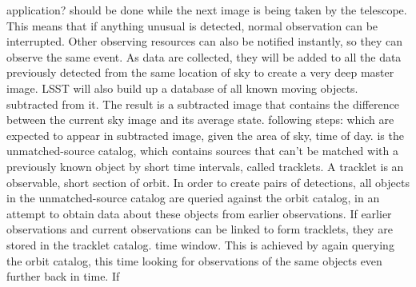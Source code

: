 \documentclass[times]{cpeauth}
\begin{document}
%
application?
%
%
%
should be done while the next image is being taken by the telescope.  This means
that if anything unusual is detected, normal observation can be
interrupted. Other observing resources can also be notified instantly, so they
can observe the same event. As data are collected, they will be added to all the
data previously detected from the same location of sky to create a very deep
master image. LSST will also build up a database of all known moving objects.
%
subtracted from it. The result is a subtracted image that contains the
difference between the current sky image and its average state.
%
following steps:
%
which are expected to appear in subtracted image, given the area of sky, time of
day.
%
is the unmatched-source catalog, which contains sources that can't be matched
with a previously known object
%
by short time intervals, called tracklets. A tracklet is an observable, short
section of orbit. In order to create pairs of detections, all objects in the
unmatched-source catalog are queried against the orbit catalog, in an attempt to
obtain data about these objects from earlier observations. If earlier
observations and current observations can be linked to form tracklets, they are
stored in the tracklet catalog.
%
time window. This is achieved by again querying the orbit catalog, this time
looking for observations of the same objects even further back in time. If
\end{document}
